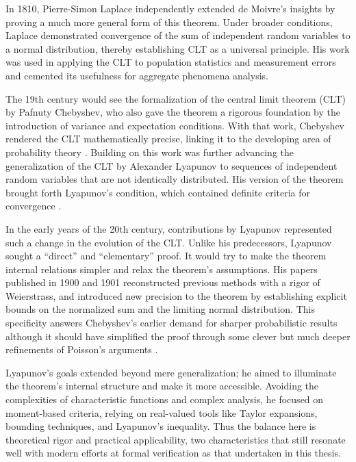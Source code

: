 In 1810, Pierre-Simon Laplace independently extended de Moivre's insights by proving a much more general form of this theorem. Under broader conditions, Laplace demonstrated convergence of the sum of independent random variables to a normal distribution, thereby establishing CLT as a universal principle. His work was used in applying the CLT to population statistics and measurement errors \cite{laplace1835oeuvres} and cemented its usefulness for aggregate phenomena analysis.

The 19th century would see the formalization of the central limit theorem (CLT) by Pafnuty Chebyshev, who also gave the theorem a rigorous foundation by the introduction of variance and expectation conditions. With that work, Chebyshev rendered the CLT mathematically precise, linking it to the developing area of probability theory \cite{chebyshev1890deux}. Building on this work was further advancing the generalization of the CLT by Alexander Lyapunov to sequences of independent random variables that are not identically distributed. His version of the theorem brought forth Lyapunov's condition, which contained definite criteria for convergence \cite{lyapunov1895pafnutii}.

In the early years of the 20th century, contributions by Lyapunov represented such a change in the evolution of the CLT. Unlike his predecessors, Lyapunov sought a “direct” and “elementary” proof. It would try to make the theorem internal relations simpler and relax the theorem's assumptions. His papers published in 1900 and 1901 reconstructed previous methods with a rigor of Weierstrass, and introduced new precision to the theorem by establishing explicit bounds on the normalized sum and the limiting normal distribution. This specificity answers Chebyshev's earlier demand for sharper probabilistic results although it should have simplified the proof through some clever but much deeper refinements of Poisson's arguments \cite{fischer2011history}.

Lyapunov’s goals extended beyond mere generalization; he aimed to illuminate the theorem’s internal structure and make it more accessible. Avoiding the complexities of characteristic functions and complex analysis, he focused on moment-based criteria, relying on real-valued tools like Taylor expansions, bounding techniques, and Lyapunov's inequality. Thus the balance here is theoretical rigor and practical applicability, two characteristics that still resonate well with modern efforts at formal verification as that undertaken in this thesis.

